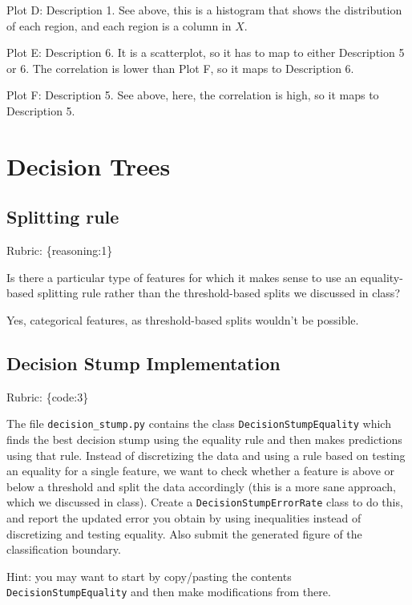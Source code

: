 \documentclass{article}
\def\rubric#1{\gre{Rubric: \{#1\}}}{}
\def\blu#1{{\color{blu}#1}}
\def\gre#1{{\color{gre}#1}}
\begin{document}
\gre{Plot D: Description 1. See above, this is a histogram that shows the distribution of each region, and each region is a column in $X$.}

\gre{Plot E: Description 6. It is a scatterplot, so it has to map to either Description 5 or 6. The correlation is lower than Plot F, so it maps to Description 6.}

\gre{Plot F: Description 5. See above, here, the correlation is high, so it maps to Description 5.}

\section{Decision Trees}

\subsection{Splitting rule}
\rubric{reasoning:1}

Is there a particular type of features for which it makes sense to use an equality-based splitting rule rather than the threshold-based splits we discussed in class?

\gre{Yes, categorical features, as threshold-based splits wouldn't be possible.}

\subsection{Decision Stump Implementation}
\rubric{code:3}

The file \texttt{decision\string_stump.py} contains the class \texttt{DecisionStumpEquality} which 
finds the best decision stump using the equality rule and then makes predictions using that
rule. Instead of discretizing the data and using a rule based on testing an equality for 
a single feature, we want to check whether a feature is above or below a threshold and 
split the data accordingly (this is a more sane approach, which we discussed in class). 
\blu{Create a \texttt{DecisionStumpErrorRate} class to do this, and report the updated error you 
obtain by using inequalities instead of discretizing and testing equality. Also submit the generated figure of the classification boundary.}

Hint: you may want to start by copy/pasting the contents \texttt{DecisionStumpEquality} and then make modifications from there. 
\end{document}

